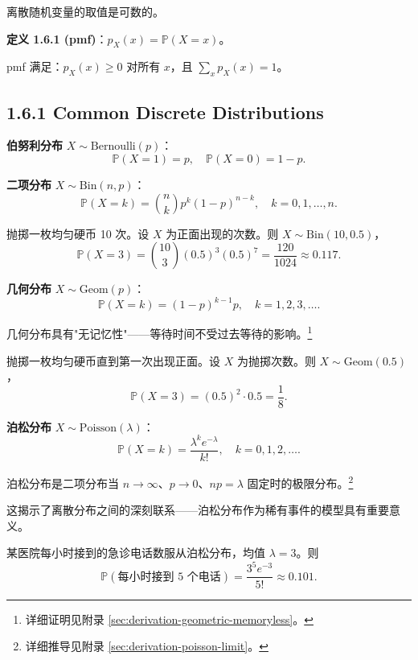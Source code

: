 离散随机变量的取值是可数的。

\begin{remark}
\textbf{定义 1.6.1 (pmf)}：$p_X(x) = \mathbb{P}(X = x)$。

pmf 满足：$p_X(x) \geq 0$ 对所有 $x$，且 $\sum_x p_X(x) = 1$。
\end{remark}

\subsection{1.6.1 Common Discrete Distributions}

\textbf{伯努利分布} $X \sim \text{Bernoulli}(p)$：
\[
\mathbb{P}(X = 1) = p, \quad \mathbb{P}(X = 0) = 1-p.
\label{eq:bernoulli-ch1}
\]

\textbf{二项分布} $X \sim \text{Bin}(n, p)$：
\[
\mathbb{P}(X = k) = \binom{n}{k} p^k (1-p)^{n-k}, \quad k = 0, 1, \ldots, n.
\label{eq:binomial-ch1}
\]

\begin{example}[二项分布]\label{ex:binomial-ch1}
抛掷一枚均匀硬币 10 次。设 $X$ 为正面出现的次数。则 $X \sim \text{Bin}(10, 0.5)$，
\[
\mathbb{P}(X = 3) = \binom{10}{3} (0.5)^3 (0.5)^7 = \frac{120}{1024} \approx 0.117.
\]
\end{example}

\textbf{几何分布} $X \sim \text{Geom}(p)$：
\[
\mathbb{P}(X = k) = (1-p)^{k-1} p, \quad k = 1, 2, 3, \ldots.
\label{eq:geometric-ch1}
\]

几何分布具有"无记忆性"——等待时间不受过去等待的影响。\footnote{详细证明见附录 \cref{sec:derivation-geometric-memoryless}。}

\begin{example}[几何分布]\label{ex:geometric-ch1}
抛掷一枚均匀硬币直到第一次出现正面。设 $X$ 为抛掷次数。则 $X \sim \text{Geom}(0.5)$，
\[
\mathbb{P}(X = 3) = (0.5)^2 \cdot 0.5 = \frac{1}{8}.
\]
\end{example}

\textbf{泊松分布} $X \sim \text{Poisson}(\lambda)$：
\[
\mathbb{P}(X = k) = \frac{\lambda^k e^{-\lambda}}{k!}, \quad k = 0, 1, 2, \ldots.
\label{eq:poisson-ch1}
\]

泊松分布是二项分布当 $n \to \infty$、$p \to 0$、$np = \lambda$ 固定时的极限分布。\footnote{详细推导见附录 \cref{sec:derivation-poisson-limit}。}

这揭示了离散分布之间的深刻联系——泊松分布作为稀有事件的模型具有重要意义。

\begin{example}[泊松分布]\label{ex:poisson-ch1}
某医院每小时接到的急诊电话数服从泊松分布，均值 $\lambda = 3$。则
\[
\mathbb{P}(\text{每小时接到 5 个电话}) = \frac{3^5 e^{-3}}{5!} \approx 0.101.
\]
\end{example}


